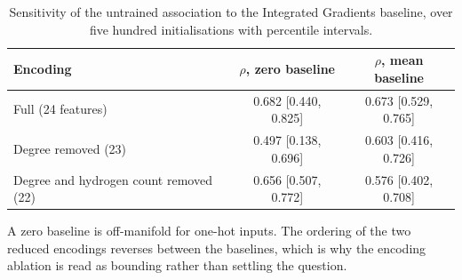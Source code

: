 \begin{table}[htbp]
\centering
\caption{Sensitivity of the untrained association to the Integrated Gradients baseline, over five hundred initialisations with percentile intervals.}
\label{tab:si_baseline}
\small
\setlength{\tabcolsep}{4pt}
\begin{tabular}{lcc}
\toprule
Encoding & $\rho$, zero baseline & $\rho$, mean baseline \\
\midrule
Full (24 features) & 0.682 [0.440, 0.825] & 0.673 [0.529, 0.765] \\
Degree removed (23) & 0.497 [0.138, 0.696] & 0.603 [0.416, 0.726] \\
Degree and hydrogen count removed (22) & 0.656 [0.507, 0.772] & 0.576 [0.402, 0.708] \\
\bottomrule
\end{tabular}
\begin{flushleft}\footnotesize A zero baseline is off-manifold for one-hot inputs. The ordering of the two reduced encodings reverses between the baselines, which is why the encoding ablation is read as bounding rather than settling the question.\end{flushleft}
\end{table}
